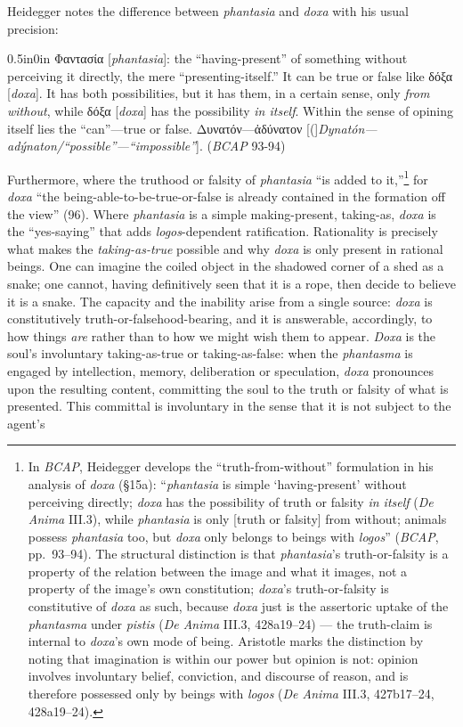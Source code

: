 \documentclass{article}
\newcommand{\gk}[1]{{\greekfont #1}}
\begin{document}
Heidegger notes the difference between \textit{phantasia} and \textit{doxa} with his usual precision: 
\begin{adjustwidth}{0.5in}{0in}
    \gk{Φαντασία} [\textit{phantasia}]: the ``having-present'' of something without perceiving it directly, the mere ``presenting-itself.'' It can be true or false like \gk{δόξα} [\textit{doxa}]. It has both possibilities, but it has them, in a certain sense, only \textit{from without}, while \gk{δόξα} [\textit{doxa}] has the possibility \textit{in itself}. Within the sense of opining itself lies the ``can''---true or false. \gk{Δυνατόν---ἀδύνατον} [(]\textit{Dynatón---adýnaton/``possible''---``impossible''}]. (\textit{BCAP} 93-94)
\end{adjustwidth}
Furthermore, where the truthood or falsity of \textit{phantasia} ``is added to it,''\footnote{In \textit{BCAP}, Heidegger develops the ``truth-from-without'' formulation in his analysis of \textit{doxa} (§15a): ``\textit{phantasia} is simple `having-present' without perceiving directly; \textit{doxa} has the possibility of truth or falsity \textit{in itself} (\textit{De Anima} III.3), while \textit{phantasia} is only [truth or falsity] from without; animals possess \textit{phantasia} too, but \textit{doxa} only belongs to beings with \textit{logos}'' (\textit{BCAP}, pp.~93--94). The structural distinction is that \textit{phantasia}'s truth-or-falsity is a property of the relation between the image and what it images, not a property of the image's own constitution; \textit{doxa}'s truth-or-falsity is constitutive of \textit{doxa} as such, because \textit{doxa} just is the assertoric uptake of the \textit{phantasma} under \textit{pistis} (\textit{De Anima} III.3, 428a19--24) --- the truth-claim is internal to \textit{doxa}'s own mode of being. Aristotle marks the distinction by noting that imagination is within our power but opinion is not: opinion involves involuntary belief, conviction, and discourse of reason, and is therefore possessed only by beings with \textit{logos} (\textit{De Anima} III.3, 427b17--24, 428a19--24).} for \textit{doxa} ``the being-able-to-be-true-or-false is already contained in the formation off the view'' (96). Where \textit{phantasia} is a simple making-present, taking-as, \textit{doxa} is the ``yes-saying'' that adds \textit{logos}-dependent ratification. Rationality is precisely what makes the \textit{taking-as-true} possible and why \textit{doxa} is only present in rational beings. One can imagine the coiled object in the shadowed corner of a shed as a snake; one cannot, having definitively seen that it is a rope, then decide to believe it is a snake. The capacity and the inability arise from a single source: \textit{doxa} is constitutively truth-or-falsehood-bearing, and it is answerable, accordingly, to how things \textit{are} rather than to how we might wish them to appear. \textit{Doxa} is the soul's involuntary taking-as-true or taking-as-false: when the \textit{phantasma} is engaged by intellection, memory, deliberation or speculation, \textit{doxa} pronounces upon the resulting content, committing the soul to the truth or falsity of what is presented. This committal is involuntary in the sense that it is not subject to the agent's 
\end{document}
